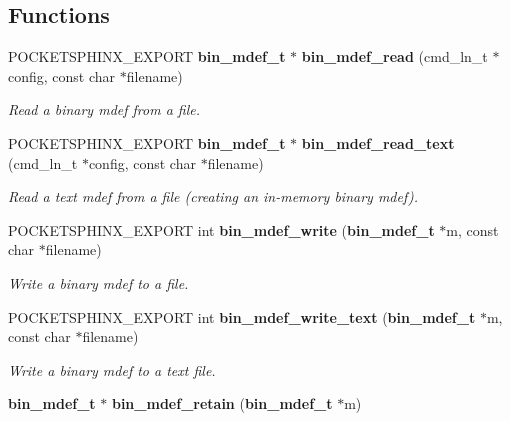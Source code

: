 \subsection*{Functions}
\begin{DoxyCompactItemize}
\item 
P\-O\-C\-K\-E\-T\-S\-P\-H\-I\-N\-X\-\_\-\-E\-X\-P\-O\-R\-T {\bf bin\-\_\-mdef\-\_\-t} $\ast$ {\bf bin\-\_\-mdef\-\_\-read} (cmd\-\_\-ln\-\_\-t $\ast$config, const char $\ast$filename)\label{bin__mdef_8h_a3930ae6b3309a615335585db4b46306f}

\begin{DoxyCompactList}\small\item\em Read a binary mdef from a file. \end{DoxyCompactList}\item 
P\-O\-C\-K\-E\-T\-S\-P\-H\-I\-N\-X\-\_\-\-E\-X\-P\-O\-R\-T {\bf bin\-\_\-mdef\-\_\-t} $\ast$ {\bf bin\-\_\-mdef\-\_\-read\-\_\-text} (cmd\-\_\-ln\-\_\-t $\ast$config, const char $\ast$filename)\label{bin__mdef_8h_a00dab94d45d1adc5f7778fd1e2398031}

\begin{DoxyCompactList}\small\item\em Read a text mdef from a file (creating an in-\/memory binary mdef). \end{DoxyCompactList}\item 
P\-O\-C\-K\-E\-T\-S\-P\-H\-I\-N\-X\-\_\-\-E\-X\-P\-O\-R\-T int {\bf bin\-\_\-mdef\-\_\-write} ({\bf bin\-\_\-mdef\-\_\-t} $\ast$m, const char $\ast$filename)\label{bin__mdef_8h_a982b8e598afed47805fab1509e8fc4bb}

\begin{DoxyCompactList}\small\item\em Write a binary mdef to a file. \end{DoxyCompactList}\item 
P\-O\-C\-K\-E\-T\-S\-P\-H\-I\-N\-X\-\_\-\-E\-X\-P\-O\-R\-T int {\bf bin\-\_\-mdef\-\_\-write\-\_\-text} ({\bf bin\-\_\-mdef\-\_\-t} $\ast$m, const char $\ast$filename)\label{bin__mdef_8h_af89d79226df33947019efcfe7377d586}

\begin{DoxyCompactList}\small\item\em Write a binary mdef to a text file. \end{DoxyCompactList}\item 
{\bf bin\-\_\-mdef\-\_\-t} $\ast$ {\bf bin\-\_\-mdef\-\_\-retain} ({\bf bin\-\_\-mdef\-\_\-t} $\ast$m)\label{bin__mdef_8h_a297167f03662a9cbd650743d3f4cf8f8}


\end{DoxyCompactItemize}
